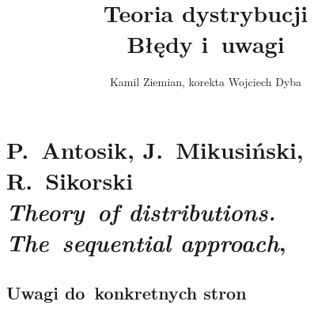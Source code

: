 \documentclass[a4paper,11pt]{article}
\title{Teoria dystrybucji \\
  {\Large Błędy i~uwagi}}
\author{Kamil Ziemian, korekta Wojciech Dyba}
\numberwithin{equation}{section}
\begin{document}





\maketitle





\section{P.~Antosik, J.~Mikusiński, R.~Sikorski \\
  \textit{Theory~of distributions. The~sequential
    approach},
  \parencite{Antosik-Mikusinski-Sikorski-Theory-of-distributions-Pub-1973}}



\subsection{Uwagi do~konkretnych stron}

\label{subsec:AMS-Theory-ETC-Uwagi-do-konkrentych-stron}




\noindent
{}









\end{document}

